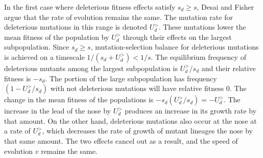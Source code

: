 \documentclass[12pt, one column]{article}
\begin{document}
In the first case where deleterious fitness effects satisfy $s_d \geq s$, Desai and Fisher argue that the rate of evolution remains the same.  The mutation rate for deleterious mutations in this range is denoted $U_d^{>}$.  These mutations lower the mean fitness of the population by $U_d^{>}$ through their effects on the largest subpopulation.  Since $s_d \geq s$, mutation-selection balance for deleterious mutations is achieved on a timescale $1/(s_d +U_d^{>}) < 1/s$.  The equilibrium frequency of deleterious mutants among the largest subpopulation is $U_d^{>}/s_d$ and their relative fitness is $-s_d$.  The portion of the large subpopulation has frequency $(1-U_d^{>}/s_d)$ with not deleterious mutations will have relative fitness $0$.  The change in the mean fitness of the populations is $-s_d (U_d^{>}/s_d) = -U_d^{>}$.  The increase in the lead of the nose by $U_d^{>}$ produces an increase in its growth rate by that amount.  On the other hand, deleterious mutations also occur at the nose at a rate of $U_d^{>}$, which decreases the rate of growth of mutant lineages the nose by that same amount.  The two effects cancel out as a result, and the speed of evolution $v$ remains the same.
\end{document}
